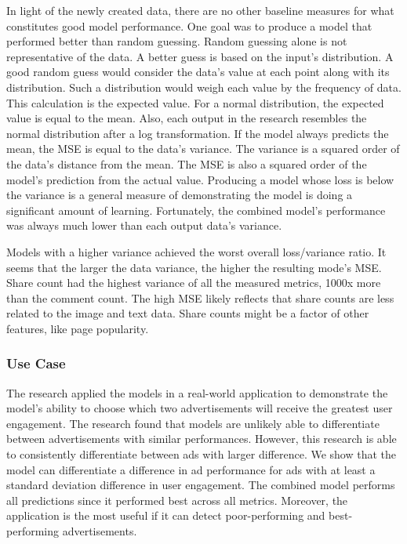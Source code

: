 \documentclass[mksc,blindrev]{informs3} %
\begin{document}
In light of the newly created data, there are no other baseline measures for what constitutes good model performance. One goal was to produce a model that performed better than random guessing. Random guessing alone is not representative of the data. A better guess is based on the input's distribution. A good random guess would consider the data's value at each point along with its distribution. Such a distribution would weigh each value by the frequency of data. This calculation is the expected value. For a normal distribution, the expected value is equal to the mean. Also, each output in the research resembles the normal distribution after a log transformation. If the model always predicts the mean, the MSE is equal to the data's variance. The variance is a squared order of the data's distance from the mean. The MSE is also a squared order of the model's prediction from the actual value. Producing a model whose loss is below the variance is a general measure of demonstrating the model is doing a significant amount of learning. Fortunately, the combined model's performance was always much lower than each output data's variance.

Models with a higher variance achieved the worst overall loss/variance ratio.  It seems that the larger the data variance, the higher the resulting mode's MSE.  Share count had the highest variance of all the measured metrics, 1000x more than the comment count.  The high MSE likely reflects that share counts are less related to the image and text data. Share counts might be a factor of other features, like page popularity.

\subsubsection{Use Case}

The research applied the models in a real-world application to demonstrate the model's ability to choose which two advertisements will receive the greatest user engagement. The research found that models are unlikely able to differentiate between advertisements with similar performances. However, this research is able to consistently differentiate between ads with larger difference. We show that the model can differentiate a difference in ad performance for ads with at least a standard deviation difference in user engagement. The combined model performs all predictions since it performed best across all metrics. Moreover, the application is the most useful if it can detect poor-performing and best-performing advertisements.
\end{document}
